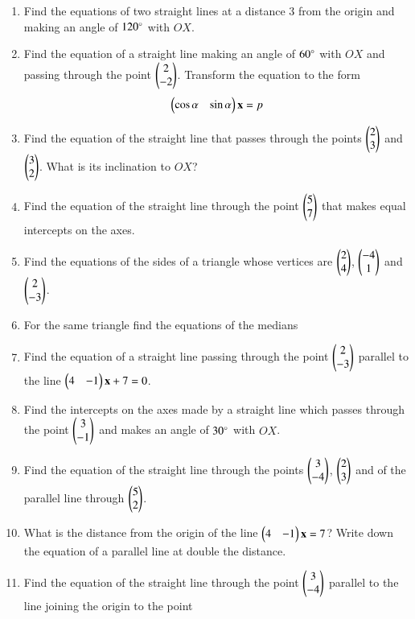 \renewcommand{\theequation}{\theenumi}
\begin{enumerate}[label=\arabic*.,ref=\thesubsection.\theenumi]
\item Find the equations of two straight lines at a distance 3 from the origin and making an angle of $120 \degree$ with $OX$.
\item Find the equation of a straight line making an angle of $60\degree$ with $OX$ and passing through the point $\begin{pmatrix}2\\-2\end{pmatrix}$.
Transform the equation to the form
\begin{equation}
\begin{pmatrix}\cos\alpha &\sin \alpha\end{pmatrix}\mathbf{x} = p 
\end{equation}
\item Find the equation of the straight line that passes through the points $\begin{pmatrix}2\\3\end{pmatrix}$ and $\begin{pmatrix}3\\2\end{pmatrix}$. What is its inclination
to $OX$?
\item Find the equation of the straight line through the point $\begin{pmatrix}5\\7\end{pmatrix}$ that makes equal intercepts on the axes.
\item Find the equations of the sides of a triangle whose vertices are $\begin{pmatrix}2\\4\end{pmatrix}$, $\begin{pmatrix}-4\\1\end{pmatrix}$ and $\begin{pmatrix}2\\-3\end{pmatrix}$.
\item For the same triangle find the equations of the medians 
\item Find the equation of a straight line passing through the point $\begin{pmatrix}2\\-3\end{pmatrix}$ parallel to the line $\begin{pmatrix}4 & -1\end{pmatrix}\mathbf{x} + 7 =0$.
\item Find the intercepts on the axes made by a straight line which passes through the point $\begin{pmatrix}3\\-1\end{pmatrix}$ and makes an angle
of $30\degree$ with $OX$.
\item Find the equation of the straight line through the points $\begin{pmatrix}3\\-4\end{pmatrix}$, $\begin{pmatrix}2\\3\end{pmatrix}$ and of the
parallel line through $\begin{pmatrix}5\\2\end{pmatrix}$.
\item What is the distance from the origin of the line $\begin{pmatrix}4 & -1\end{pmatrix}\mathbf{x} = 7$? Write down the equation of a parallel line at double the distance.
\item Find the equation of the straight line through the point $\begin{pmatrix}3\\-4\end{pmatrix}$ parallel to the line joining the origin to the point

\end{enumerate}
